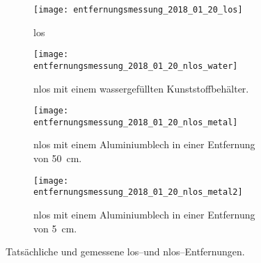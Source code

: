 \begin{figure}[ht]
	\centering
	\begin{subfigure}[t]{0.49\linewidth}
		\centering
		\texttt{[image: entfernungsmessung\_2018\_01\_20\_los]}
		\caption{\Gls{los}}
		\label{fig:entfernungsmessung_2018_01_20_los}
	\end{subfigure}
	\hfill
	\begin{subfigure}[b]{0.49\linewidth}
		\centering
		\texttt{[image: entfernungsmessung\_2018\_01\_20\_nlos\_water]}
		\caption{\Gls{nlos} mit einem wassergefüllten Kunststoffbehälter.}
		\label{fig:entfernungsmessung_2018_01_20_nlos_water}
	\end{subfigure}
	\par
	\bigskip
	\begin{subfigure}[b]{0.49\linewidth}
		\centering
		\texttt{[image: entfernungsmessung\_2018\_01\_20\_nlos\_metal]}
		\caption{\Gls{nlos} mit einem Aluminiumblech in einer Entfernung von \SI{50}{\centi\meter}.}
		\label{fig:entfernungsmessung_2018_01_20_nlos_metal}
	\end{subfigure}
	\hfill
	\begin{subfigure}[b]{0.49\linewidth}
		\centering
		\texttt{[image: entfernungsmessung\_2018\_01\_20\_nlos\_metal2]}
		\caption{\Gls{nlos} mit einem Aluminiumblech in einer Entfernung von \SI{5}{\centi\meter}.}
		\label{fig:entfernungsmessung_2018_01_20_nlos_metal2}
	\end{subfigure}
	\caption{Tatsächliche und gemessene \Gls{los}--und \Gls{nlos}--Entfernungen.}
	\label{fig:entfernungsmessung_2018_01_20}
\end{figure}


\begin{comment}
--------------------------------------------------------------------------------
- Diagramme
	- \cite{kurth2003experimental}
		- Fig. 5: (1) The ground truth path with tags indicated by circles. The numbers indicate how many range measurements were received from each tag over the duration of Test 1. (2) The path estimate from dead reckoning alone. (3) The path estimate from localization using a Kalman Filter. The Filter fuses data from odometry and a gyro with absolute measurements from RF tags to produce this path estimate. Numerical results are given in Table 1. (X: position in x(m), Y: position in y(m), Ground truth path with tag locations, Dead reckoning path, Kalman filter localization path)

		
- Versuchsbeschreibung:
	- Warum wurden die uwbm da platziert wo sie jetzt stehen?
	
\end{comment}
